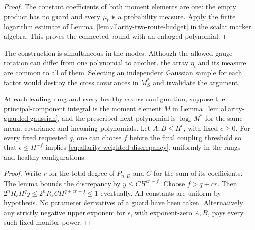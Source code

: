 \begin{proof}
The constant coefficients of both moment elements are one: the empty
product has no guard and every $\mu_t$ is a probability measure.
Apply the finite logarithm estimate of
Lemma~\ref{lem:allarity-two-route-budget} in the scalar marker algebra.
This proves the connected bound with an enlarged polynomial.
\end{proof}

The construction is simultaneous in the modes. Although the allowed
gauge rotation can differ from one polynomial to another, the array
$\eta_t$ and its measure are common to all of them. Selecting an
independent Gaussian sample for each factor would destroy the cross
covariances in $M^*_S$ and invalidate the argument.

\begin{corollary}
\label{cor:allarity-guarded-purchase}
At each leading rung and every healthy coarse configuration, suppose
the principal-component integral is the moment element $M$ in
Lemma~\ref{lem:allarity-guarded-gaussian}, and the prescribed next
polynomial is $\log_*M^*$ for the same mean, covariance and incoming
polynomials. Let $A,B\le H^c$, with fixed $c\ge0$. For every fixed
requested $q$, one can choose $f$ before the final coupling threshold
so that $\epsilon\le H^{-f}$ implies
\eqref{eq:allarity-weighted-discrepancy}, uniformly in the rungs and
healthy configurations.
\end{corollary}
\begin{proof}
Write $r$ for the total degree of $P_{n,D}$ and $C$ for the sum of its
coefficients. The lemma bounds the discrepancy by
$y\le C H^{cr-f}$. Choose $f>q+cr$. Then
$2^nR_eH^qy\le 2^nR_e C H^{q+cr-f}\le1$ eventually.
All constants are uniform by hypothesis. No parameter derivatives of
a guard have been taken. Alternatively any strictly negative upper
exponent for $\epsilon$, with exponent-zero $A,B$, pays every such
fixed monitor power.
\end{proof}

